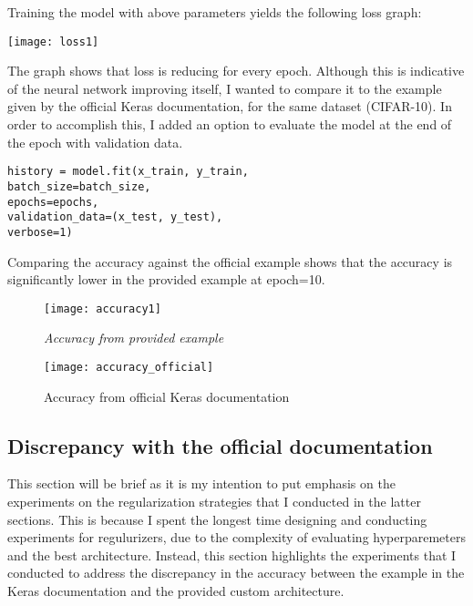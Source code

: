 \documentclass{article}
\begin{document}
Training the model with above parameters yields the following loss graph:

\begin{center}
    \texttt{[image: loss1]}
\end{center}

The graph shows that loss is reducing for every epoch. Although this is indicative of the neural network improving itself, I wanted to compare it to the example given by the official Keras documentation, for the same dataset (CIFAR-10). In order to accomplish this, I added an option to evaluate the model at the end of the epoch with validation data.

\begin{lstlisting}
history = model.fit(x_train, y_train,
batch_size=batch_size,
epochs=epochs,
validation_data=(x_test, y_test),
verbose=1)
\end{lstlisting}

Comparing the accuracy against the official example shows that the accuracy is significantly lower in the provided example at epoch=10.

\begin{figure}[H]
    \begin{center}
        \texttt{[image: accuracy1]}
        \caption{\small \sl Accuracy from provided example}
    \end{center}
\end{figure}

\begin{figure}[H]
    \begin{center}
        \texttt{[image: accuracy\_official]}
        \caption{Accuracy from official Keras documentation\autocite{cifar10}}
    \end{center}
\end{figure}


\subsection{Discrepancy with the official documentation}
This section will be brief as it is my intention to put emphasis on the experiments on the regularization strategies that I conducted in the latter sections. This is because I spent the longest time designing and conducting experiments for regulurizers, due to the complexity of evaluating hyperparemeters and the best architecture. Instead, this section highlights the experiments that I conducted to address the discrepancy in the accuracy between the example in the Keras documentation and the provided custom architecture.
\end{document}
